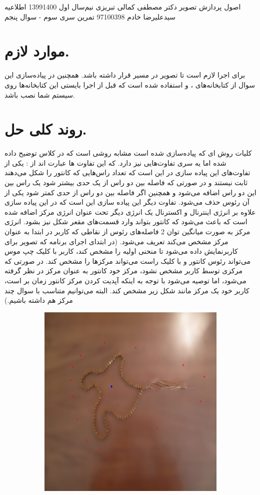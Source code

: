 \documentclass[a4paper,12pt]{article}
\begin{document}
	\handout
	{اصول پردازش تصویر}
	{دکتر مصطفی کمالی تبریزی}
	{نیم‌سال اول 1399\lr{-}1400}
	{اطلاعیه}
	{سیدعلیرضا خادم}
	{97100398}
	{تمرین سری سوم - سوال پنجم}
	\section*{موارد لازم.}
	برای اجرا لازم است تا تصویر
	در مسیر
	قرار داشته باشد. همچنین در پیاده‌سازی این سوال از کتابخانه‌های 
	،
	و
	استفاده شده است که قبل از اجرا بایستی این کتابخانه‌ها روی سیستم شما نصب باشد.
	\section*{روند کلی حل.}
کلیات روش 
‌ای
که پیاده‌سازی شده است مشابه روشی است که در کلاس توضیح داده شده اما یه سری تفاوت‌هایی نیز دارد. که این تفاوت ها عبارت اند از : یکی از تفاوت‌های این پیاده سازی در این است که تعداد راس‌هایی که کانتور را شکل می‌دهند ثابت نیستند و در صورتی که فاصله بین دو راس از یک حدی بیشتر شود یک راس بین این دو راس اضافه می‌شود و همچنین اگر فاصله بین دو راس از حدی کمتر شود یکی از آن رئوس حذف می‌شود.
تفاوت دیگر این پیاده سازی این است که در این پیاده سازی علاوه بر انرژی اینترنال و اکسترنال یک انرژی دیگر تحت عنوان انرژی مرکز اضافه شده است که باعث می‌شود که کانتور بتواند وارد قسمت‌های مقعر شکل نیز بشود. انرژی مرکز به صورت میانگین توان 2 فاصله‌های رئوس از نقاطی که کاربر در ابتدا به عنوان مرکز مشخص می‌کند تعریف ‌می‌شود. (در ابتدای اجرای برنامه که تصویر برای کاربرنمایش داده می‌شود تا منحنی اولیه را مشخص کند، کاربر با کلیک چپ موس می‌تواند رئوس کانتور و با کلیک راست می‌تواند مرکزها را مشخص کند. در صورتی که مرکزی توسط کاربر مشخص نشود، مرکز خود کانتور به عنوان مرکز در نظر گرفته می‌شود، اما توصیه می‌شود با توجه به اینکه آپدیت کردن مرکز کانتور زمان بر است، کاربر خود یک مرکز مانند شکل زیر مشخص کند. البته می‌توانیم متناسب با سوال چند مرکز هم داشته باشیم.)
	\begin{figure}[H]
		\centering
		\begin{subfigure}{0.5\textwidth}
			\centering
			\includegraphics[width=.8\textwidth]{1.png}
		\end{subfigure}
	\end{figure} 
\end{document}
